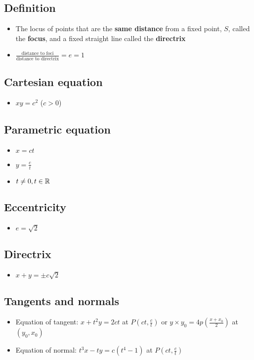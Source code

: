 \subsection{Definition}
\begin{itemize}
    \item The locus of points that are the \textbf{same distance} from a fixed point, $S$,
          called the \textbf{focus}, and a fixed straight line called the \textbf{directrix}
    \item $\frac{\text{distance to foci}}{\text{distance to directrix}} = e = 1$
\end{itemize}
\subsection{Cartesian equation}
\begin{itemize}
    \item $xy=c^2$ ($c>0$)
\end{itemize}
\subsection{Parametric equation}
\begin{itemize}
    \item $x=ct$
    \item $y=\frac{c}{t}$
    \item $t \neq 0, t\in\operatorname{\mathbb{R}}$
\end{itemize}
\subsection{Eccentricity}
\begin{itemize}
    \item $e=\sqrt{2}$
\end{itemize}
\subsection{Directrix}
\begin{itemize}
    \item $x+y=\pm c\sqrt{2}$
\end{itemize}
\subsection{Tangents and normals}
\begin{itemize}
    \item Equation of tangent: $x+t^2y=2ct$ at $P\left(ct, \frac{c}{t}\right)$ or
    $y\times y_0 = 4p \left(\frac{x+x_0}{2}\right)$ at $(y_0, x_0)$
    \item Equation of normal: $t^3x-ty=c\left(t^4-1\right)$ at $P\left(ct, \frac{c}{t}\right)$
\end{itemize}

